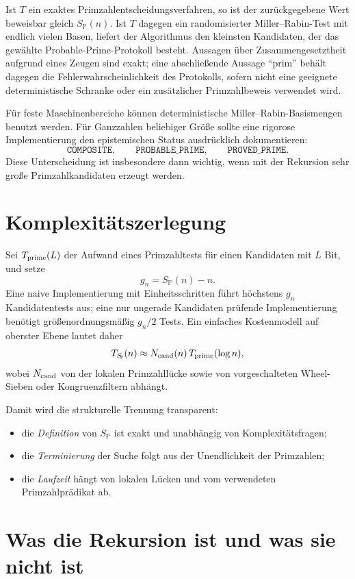 \documentclass[11pt]{article}
\theoremstyle{definition}
\newcommand{\Pp}{\mathbb{P}}
\newcommand{\SP}{S_{\!\Pp}}
\newcommand{\gap}{g}
\begin{document}
Ist $T$ ein exaktes Primzahlentscheidungsverfahren, so ist der zurückgegebene Wert beweisbar gleich $\SP(n)$. Ist $T$ dagegen ein randomisierter Miller--Rabin-Test mit endlich vielen Basen, liefert der Algorithmus den kleinsten Kandidaten, der das gewählte Probable-Prime-Protokoll besteht. Aussagen über Zusammengesetztheit aufgrund eines Zeugen sind exakt; eine abschließende Aussage ``prim'' behält dagegen die Fehlerwahrscheinlichkeit des Protokolls, sofern nicht eine geeignete deterministische Schranke oder ein zusätzlicher Primzahlbeweis verwendet wird.

Für feste Maschinenbereiche können deterministische Miller--Rabin-Basismengen benutzt werden. Für Ganzzahlen beliebiger Größe sollte eine rigorose Implementierung den epistemischen Status ausdrücklich dokumentieren:
\[
\texttt{COMPOSITE},\qquad \texttt{PROBABLE\_PRIME},\qquad \texttt{PROVED\_PRIME}.
\]
Diese Unterscheidung ist insbesondere dann wichtig, wenn mit der Rekursion sehr große Primzahlkandidaten erzeugt werden.

\section{Komplexitätszerlegung}

Sei $T_{\rm prime}(L)$ der Aufwand eines Primzahltests für einen Kandidaten mit $L$ Bit, und setze
\[
\gap_n=\SP(n)-n.
\]
Eine naive Implementierung mit Einheitsschritten führt höchstens $\gap_n$ Kandidatentests aus; eine nur ungerade Kandidaten prüfende Implementierung benötigt größenordnungsmäßig $\gap_n/2$ Tests. Ein einfaches Kostenmodell auf oberster Ebene lautet daher
\[
T_{\SP}(n)\approx N_{\rm cand}(n)\,T_{\rm prime}(\log n),
\]
wobei $N_{\rm cand}$ von der lokalen Primzahllücke sowie von vorgeschalteten Wheel-Sieben oder Kongruenzfiltern abhängt.

Damit wird die strukturelle Trennung transparent:
\begin{itemize}
\item die \emph{Definition} von $\SP$ ist exakt und unabhängig von Komplexitätsfragen;
\item die \emph{Terminierung} der Suche folgt aus der Unendlichkeit der Primzahlen;
\item die \emph{Laufzeit} hängt von lokalen Lücken und vom verwendeten Primzahlprädikat ab.
\end{itemize}

\section{Was die Rekursion ist und was sie nicht ist}
\end{document}
